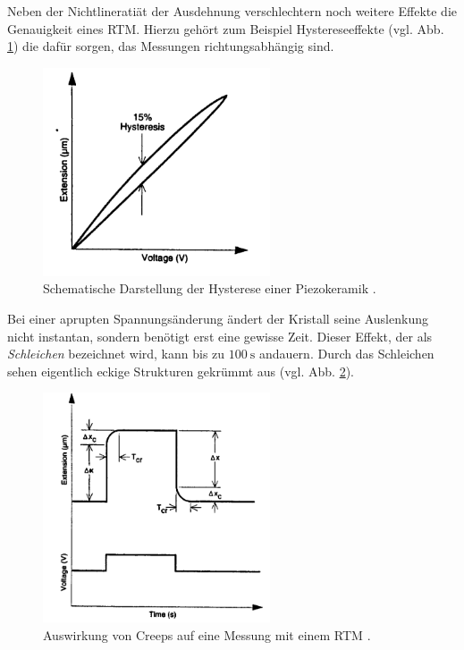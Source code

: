 Neben der Nichtlineratiät der Ausdehnung verschlechtern noch weitere
Effekte die Genauigkeit eines RTM. Hierzu gehört zum Beispiel Hystereseeffekte (vgl. Abb. \ref{fig: hysterese}) die dafür sorgen,
das Messungen richtungsabhängig sind.
\begin{figure}[!h]
  \centering
  \includegraphics[width=0.6\textwidth]{./pics/hysterese.png}
  \caption{Schematische Darstellung der Hysterese einer Piezokeramik \cite{rtm}.}
  \label{fig: hysterese}
\end{figure}
Bei einer aprupten Spannungsänderung ändert der Kristall seine Auslenkung nicht instantan, sondern benötigt erst eine gewisse Zeit.
Dieser Effekt, der als \emph{Schleichen} bezeichnet wird, kann bis zu $\SI{100}{\second}$ andauern.
Durch das Schleichen sehen eigentlich eckige Strukturen gekrümmt aus (vgl. Abb. \ref{fig: creep}).
\begin{figure}[!h]
  \centering
  \includegraphics[width=0.6\textwidth]{./pics/creep.png}
  \caption{Auswirkung von Creeps auf eine Messung mit einem RTM \cite{rtm}.}
  \label{fig: creep}
\end{figure}
